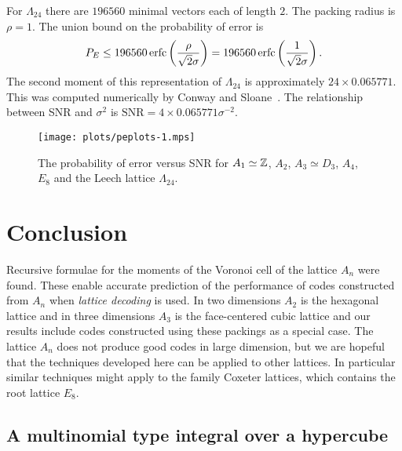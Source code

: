 \documentclass[draftcls, onecolumn, 11pt]{IEEEtran}
\begin{document}
For $\Lambda_{24}$ there are $196560$ minimal vectors each of length $2$.  The packing radius is $\rho = 1$.  The union bound on the probability of error is
\[
P_E \leq 196560\operatorname{erfc}\left( \frac{\rho}{\sqrt{2}\sigma} \right) = 196560\operatorname{erfc}\left(\frac{1}{\sqrt{2}\sigma}\right).
\]
The second moment of this representation of $\Lambda_{24}$ is approximately $24 \times 0.065771$.  This was computed numerically by Conway and Sloane~\cite[p. 61]{SPLAG}.  The relationship between SNR and $\sigma^2$ is $\text{SNR} = 4 \times 0.065771 \sigma^{-2}$.

\begin{figure*}[tp]
	\centering 
		\texttt{[image: plots/peplots-1.mps]}
		\caption{The probability of error versus SNR for $A_1 \simeq {\mathbb Z}$, $A_2$, $A_3\simeq D_3$, $A_4$, $E_8$ and the Leech lattice $\Lambda_{24}$.}
		\label{fig:peplots}
\end{figure*}


\section{Conclusion}

Recursive formulae for the moments of the Voronoi cell of the lattice $A_n$ were found.  These enable accurate prediction of the performance of codes constructed from $A_n$ when \emph{lattice decoding} is used.  In two dimensions $A_2$ is the hexagonal lattice and in three dimensions $A_3$ is the face-centered cubic lattice and our results include codes constructed using these packings as a special case.  The lattice $A_n$ does not produce good codes in large dimension, but we are hopeful that the techniques developed here can be applied to other lattices.  In particular similar techniques might apply to the family Coxeter lattices, which contains the root lattice $E_8$.  


\appendix


\subsection{A multinomial type integral over a hypercube}\label{sec:mult-type-integr}
\end{document}
